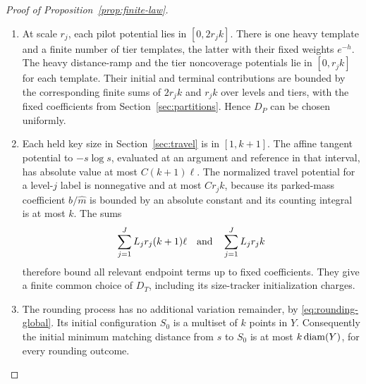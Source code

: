 \begin{proof}[Proof of Proposition~\ref{prop:finite-law}]
\begin{enumerate}
At an internal vertex, the sizes, core sums and cap scales are bounded by
fixed multiples of $k$.  The proportion variables have the fixed simplex
or bounded-$\ell_1$ domains used in their definitions.  The primitive bounds
in Section~\ref{sec:proportions} therefore bound the absolute values of
both proportion potentials by a finite quantity, for example
$C\ell k(d_v+1)$ after increasing an absolute constant.  The switching
potential is bounded by $Ck$.  Initial size and epoch charges likewise
involve only these bounded sizes.  Multiplying these finitely many bounds
by their fixed star weights $r_{|v|}$ and by the fixed coefficients in the
local estimates gives a finite common choice of $D_A$.

\item At scale $r_j$, each pilot potential lies in $[0,2r_jk]$.
There is one heavy template and a finite number of tier templates, the
latter with their fixed weights $e^{-h}$.  The heavy distance-ramp and the
tier noncoverage potentials lie in $[0,r_jk]$ for each template.  Their
initial and terminal contributions are bounded by the corresponding
finite sums of $2r_jk$ and $r_jk$ over levels and tiers, with the fixed
coefficients from Section~\ref{sec:partitions}.  Hence $D_P$ can be
chosen uniformly.

\item Each held key size in Section~\ref{sec:travel} is in $[1,k+1]$.
The affine tangent potential to $-s\log s$, evaluated at an argument and
reference in that interval, has absolute value at most
$C(k+1)\ell$.  The normalized travel potential for a level-$j$ label is
nonnegative and at most $Cr_jk$, because its parked-mass coefficient
$b/\widehat m$ is bounded by an absolute constant and its counting
integral is at most $k$.  The sums
\[
 \sum_{j=1}^J L_j r_j(k+1)\ell
       \quad\hbox{and}\quad
 \sum_{j=1}^J L_j r_jk
\]
therefore bound all relevant endpoint terms up to fixed coefficients.
They give a finite common choice of $D_T$, including its size-tracker
initialization charges.

\item The rounding process has no additional variation remainder, by
\eqref{eq:rounding-global}.  Its initial configuration $S_0$ is a multiset
of $k$ points in $Y$.  Consequently the initial minimum matching distance
from $s$ to $S_0$ is at most $k\operatorname{diam}(Y)$, for every rounding outcome.
\end{enumerate}


\end{proof}

